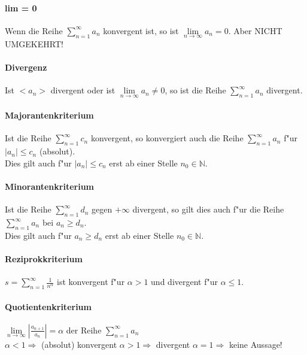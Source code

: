 \paragraph{lim = 0}
  Wenn die Reihe $ \sum\limits_{n=1}^{\infty} a_n $ konvergent ist, so ist
  $\lim\limits_{n \to \infty} a_n = 0$. \hspace{2cm} Aber NICHT UMGEKEHRT!

\paragraph{Divergenz}
  Ist $<a_n>$ divergent oder ist $\lim\limits_{n \to \infty} a_n \neq 0$, so
  ist die Reihe $ \sum\limits_{n=1}^{\infty} a_n $ divergent.

\paragraph{Majorantenkriterium}
  Ist die Reihe $ \sum\limits_{n=1}^{\infty} c_n $ konvergent, so konvergiert
  auch die Reihe $ \sum\limits_{n=1}^{\infty} a_n $ f"ur $|a_n| \leq c_n$ (absolut). \\ Dies gilt auch f"ur $|a_n| \leq c_n$ erst ab einer Stelle $n_0 \in \mathbb{N}$.

\paragraph{Minorantenkriterium}
  Ist die Reihe $ \sum\limits_{n=1}^{\infty} d_n $ gegen $+\infty$ divergent, so
  gilt dies auch f"ur die Reihe $ \sum\limits_{n=1}^{\infty} a_n $ bei $a_n \geq d_n$. \\ Dies gilt auch f"ur $a_n \geq d_n$ erst ab einer Stelle $n_0 \in \mathbb{N}$.

\paragraph{Reziprokkriterium}
  $ s = \sum\limits_{n=1}^{\infty} \frac{1}{n^\alpha} $ ist konvergent f"ur
  $\alpha > 1$ und divergent f"ur $\alpha \leq 1$.

\paragraph{Quotientenkriterium}
  $ \lim\limits_{n \to \infty} \left|\frac{a_{n+1}}{a_n}\right| = \alpha $ der
Reihe $ \sum\limits_{n=1}^{\infty} a_n $ \\ $\alpha < 1 \Rightarrow$ (absolut) konvergent \hspace{3cm}
  $\alpha > 1 \Rightarrow$ divergent \hspace{4cm} 
  $\alpha = 1 \Rightarrow$ keine Aussage!

